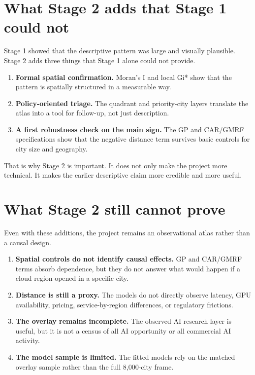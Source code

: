 \documentclass[11pt]{article}
\begin{document}
\section{What Stage 2 adds that Stage 1 could not}
Stage 1 showed that the descriptive pattern was large and visually plausible. Stage 2 adds three things that Stage 1 alone could not provide.
\begin{enumerate}[leftmargin=*]
    \item \textbf{Formal spatial confirmation.} Moran's I and local Gi* show that the pattern is spatially structured in a measurable way.
    \item \textbf{Policy-oriented triage.} The quadrant and priority-city layers translate the atlas into a tool for follow-up, not just description.
    \item \textbf{A first robustness check on the main sign.} The GP and CAR/GMRF specifications show that the negative distance term survives basic controls for city size and geography.
\end{enumerate}

That is why Stage 2 is important. It does not only make the project more technical. It makes the earlier descriptive claim more credible and more useful.

\section{What Stage 2 still cannot prove}
Even with these additions, the project remains an observational atlas rather than a causal design.
\begin{enumerate}[leftmargin=*]
    \item \textbf{Spatial controls do not identify causal effects.} GP and CAR/GMRF terms absorb dependence, but they do not answer what would happen if a cloud region opened in a specific city.
    \item \textbf{Distance is still a proxy.} The models do not directly observe latency, GPU availability, pricing, service-by-region differences, or regulatory frictions.
    \item \textbf{The overlay remains incomplete.} The observed AI research layer is useful, but it is not a census of all AI opportunity or all commercial AI activity.
    \item \textbf{The model sample is limited.} The fitted models rely on the matched overlay sample rather than the full 8{,}000-city frame.
\end{enumerate}
\end{document}
